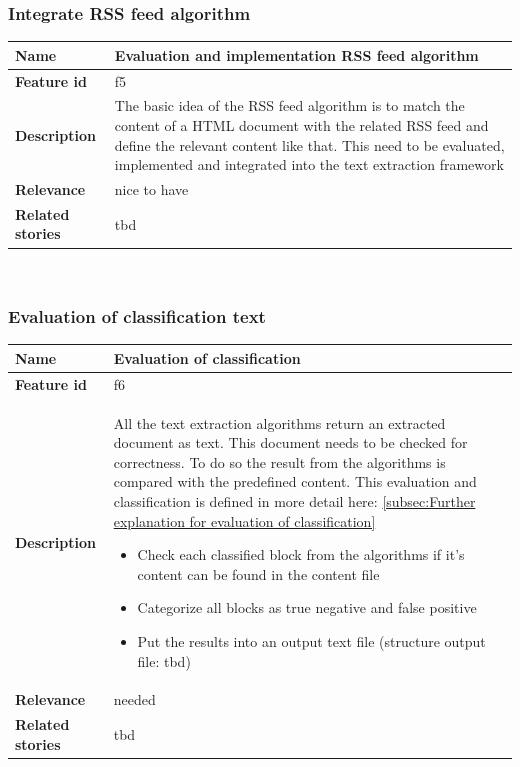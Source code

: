 \subsubsection{Integrate RSS feed algorithm}

\begin{tabular}{ | p{3cm} | p{12cm} |}
	\hline
	\textbf{Name} 				& Evaluation and implementation RSS feed algorithm \\ \hline
	\textbf{Feature id} 		& f5 \\ \hline
	\textbf{Description} 		& The basic idea of the RSS feed algorithm is to match the content of a HTML document with the related RSS feed and define the relevant content like that. This need to be evaluated, implemented and integrated into the text extraction framework  \\ \hline
	\textbf{Relevance} 			& nice to have\\ \hline
	\textbf{Related stories} 	& tbd \\ \hline
	\end{tabular} \\

\subsubsection{Evaluation of classification text}

	\begin{tabular}{ | p{3cm} | p{12cm} |}
	\hline
	\textbf{Name} 				& Evaluation of classification \\ \hline
	\textbf{Feature id} 		& f6 \\ \hline
	\textbf{Description} 		& All the text extraction algorithms return an extracted document as text. This document needs to be checked for correctness. To do so the result from the algorithms is compared with the predefined content. This evaluation and classification is defined in more detail here: \ref{subsec:Further explanation for evaluation of classification}
								\begin{itemize}
							        \item Check each classified block from the algorithms if it's content can be found in the content file
							        \item Categorize all blocks as true negative and false positive
							        \item Put the results into an output text file (structure output file: tbd)
						        \end{itemize} \\ \hline
	\textbf{Relevance} 			& needed\\ \hline
	\textbf{Related stories} 	& tbd \\ \hline
	\end{tabular} \\


